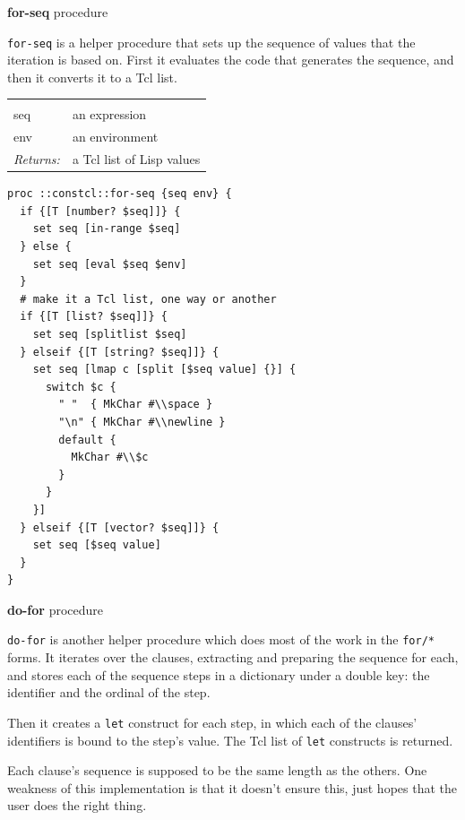 \documentclass[twoside,9pt]{report}
\begin{document}
\textbf{for-seq} procedure


\texttt{for-seq} is a helper procedure that sets up the sequence of values that the iteration is based on. First it evaluates the code that generates the sequence, and then it converts it to a Tcl list.

\noindent\begin{tabular}{ |p{1.9cm} p{8cm}| }
\hline
\rowcolor[HTML]{CCCCCC} \multicolumn{2}{|l|}{\bf for-seq (internal)} \\
seq & an expression \\
env & an environment \\
\textit{Returns:} & a Tcl list of Lisp values \\
\hline
\end{tabular}
\begin{lstlisting}
proc ::constcl::for-seq {seq env} {
  if {[T [number? $seq]]} {
    set seq [in-range $seq]
  } else {
    set seq [eval $seq $env]
  }
  # make it a Tcl list, one way or another
  if {[T [list? $seq]]} {
    set seq [splitlist $seq]
  } elseif {[T [string? $seq]]} { 
    set seq [lmap c [split [$seq value] {}] {
      switch $c {
        " "  { MkChar #\\space }
        "\n" { MkChar #\\newline }
        default {
          MkChar #\\$c
        }
      }
    }]
  } elseif {[T [vector? $seq]]} {
    set seq [$seq value]
  }
}
\end{lstlisting}


\textbf{do-for} procedure


\texttt{do-for} is another helper procedure which does most of the work in the \texttt{for/*} forms. It iterates over the clauses, extracting and preparing the sequence for each, and stores each of the sequence steps in a dictionary under a double key: the identifier and the ordinal of the step.


Then it creates a \texttt{let} construct for each step, in which each of the clauses' identifiers is bound to the step's value. The Tcl list of \texttt{let} constructs is returned.


Each clause's sequence is supposed to be the same length as the others. One weakness of this implementation is that it doesn't ensure this, just hopes that the user does the right thing.
\end{document}
